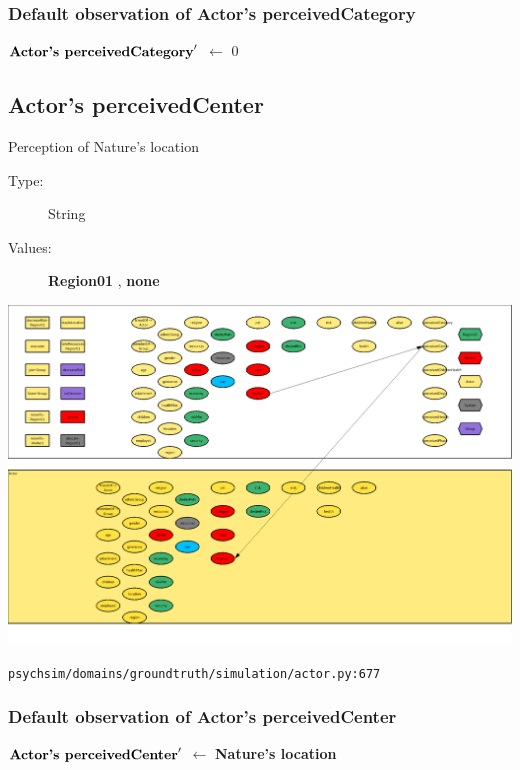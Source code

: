 \documentclass{article}%
\begin{document}
%
\subsubsection{Default observation of Actor's perceivedCategory}%
\label{ssubsec:Default observation of Actor's perceivedCategory}%
\begin{flushleft}%
$\mbox{\textbf{Actor's perceivedCategory}} '$%
$\leftarrow$%
0%
\end{flushleft}

%
\subsection{Actor's perceivedCenter}%
\label{subsec:Actor's perceivedCenter}%
Perception of Nature's location%
\begin{description}%
\item[Type:]%
String%
\item[Values:]%
\textbf{Region01}%
, %
\textbf{none}%
\end{description}%
\includegraphics[width=\textwidth]{images/perceivedCenterOfActor.png}%
\begin{flushleft}%
\verb|psychsim/domains/groundtruth/simulation/actor.py:677|%
\end{flushleft}%
\subsubsection{Default observation of Actor's perceivedCenter}%
\label{ssubsec:Default observation of Actor's perceivedCenter}%
\begin{flushleft}%
$\mbox{\textbf{Actor's perceivedCenter}} '$%
$\leftarrow$%
\textbf{Nature's location}%
\end{flushleft}
\end{document}
